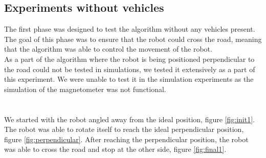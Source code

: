     \subsection{Experiments without vehicles}
        The first phase was designed to test the algorithm without any vehicles present. The goal of this phase was to ensure that the robot could cross the road, meaning that the algorithm was able to control the movement of the robot.\\
        As a part of the algorithm where the robot is being positioned perpendicular to the road could not be tested in simulations, we tested it extensively as a part of this experiment. We were unable to test it in the simulation experiments as the simulation of the magnetometer was not functional.\\\\
        \\
            We started with the robot angled away from the ideal position, figure \ref{fig:init1}. The robot was able to rotate itself to reach the ideal perpendicular position, figure \ref{fig:perpendicular}. After reaching the perpendicular position, the robot was able to cross the road and stop at the other side, figure \ref{fig:final1}.\\
